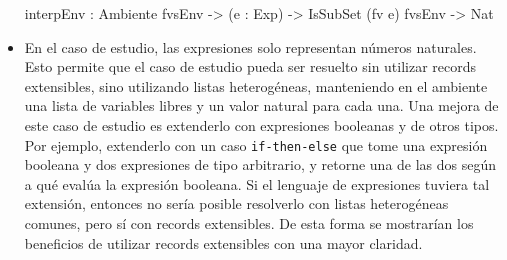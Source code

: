 \begin{itemize}
\begin{code}
interpEnv : Ambiente fvsEnv -> (e : Exp) ->
  IsSubSet (fv e) fvsEnv -> Nat
\end{code}

\item En el caso de estudio, las expresiones solo representan números naturales. Esto permite que el caso de estudio pueda ser resuelto sin utilizar records extensibles, sino utilizando listas heterogéneas, manteniendo en el ambiente una lista de variables libres y un valor natural para cada una. Una mejora de este caso de estudio es extenderlo con expresiones booleanas y de otros tipos. Por ejemplo, extenderlo con un caso \texttt{if-then-else} que tome una expresión booleana y dos expresiones de tipo arbitrario, y retorne una de las dos según a qué evalúa la expresión booleana. Si el lenguaje de expresiones tuviera tal extensión, entonces no sería posible resolverlo con listas heterogéneas comunes, pero sí con records extensibles. De esta forma se mostrarían los beneficios de utilizar records extensibles con una mayor claridad.
\end{itemize}
